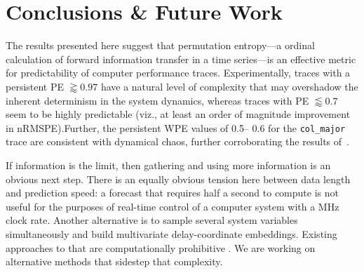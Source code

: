 \documentclass{article}
\begin{document}



















\section{ Conclusions \& Future Work}\label{sec:conc}

The results presented here suggest that permutation entropy---a ordinal
calculation of forward information transfer in a time series---is an effective
metric for predictability of computer performance traces. Experimentally, traces
with a persistent PE $\gtrapprox 0.97$ have a natural level of complexity that
may overshadow the inherent determinism in the system dynamics, whereas traces
with PE $\lessapprox 0.7$ seem to be highly predictable (viz., at least an order
of magnitude improvement in nRMSPE).Further, the persistent WPE values of 0.5--
0.6 for the {\tt col\_major} trace are consistent with dynamical chaos, further
corroborating the results of~\cite{mytkowicz09}.

If information is the limit, then gathering and using more information is an
obvious next step.  There is an equally obvious tension here between data length
and prediction speed: a forecast that requires half a second to compute is not
useful for the purposes of real-time control of a computer system with a MHz
clock rate.  Another alternative is to sample several system variables
simultaneously and build multivariate delay-coordinate embeddings.  Existing
approaches to that are computationally prohibitive
\cite{cao-multivariate-embedding}.  We are working on alternative
methods that sidestep that complexity.
\end{document}

